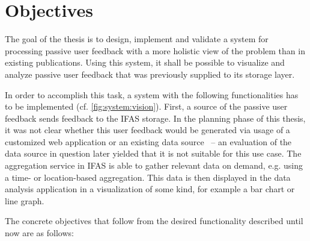 
\section{Objectives}
\label{sec:intro:objectives}


The goal of the thesis is to design, implement and validate a system for processing passive user feedback with a more holistic view of the problem than in existing publications.
Using this system, it shall be possible to visualize and analyze passive user feedback that was previously supplied to its storage layer.

In order to accomplish this task, a system with the following functionalities has to be implemented (cf. \cref{fig:system:vision}).
First, a source of the passive user feedback sends feedback to the \ac{IFAS} storage.
In the planning phase of this thesis, it was not clear whether this user feedback would be generated via usage of a customized web application or an existing data source~\citet{Deka:2017:Rico} -- an evaluation of the data source in question later yielded that it is not suitable for this use case.
The aggregation service in \ac{IFAS} is able to gather relevant data on demand, e.g. using a time- or location-based aggregation.
This data is then displayed in the data analysis application in a visualization of some kind, for example a bar chart or line graph.

The concrete objectives that follow from the desired functionality described until now are as follows:

